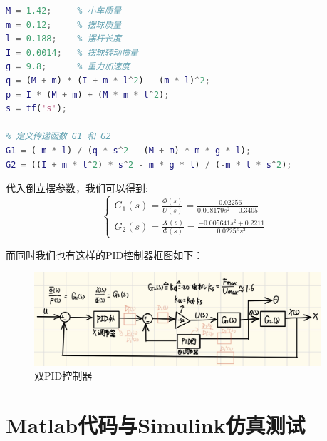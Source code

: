 \documentclass{article}
\begin{document}
\begin{lstlisting}[language=matlab,numbers=none]
% 定义系统参数
M = 1.42;     % 小车质量
m = 0.12;     % 摆球质量
l = 0.188;    % 摆杆长度
I = 0.0014;   % 摆球转动惯量
g = 9.8;      % 重力加速度
q = (M + m) * (I + m * l^2) - (m * l)^2;
p = I * (M + m) + (M * m * l^2);
s = tf('s');

% 定义传递函数 G1 和 G2
G1 = (-m * l) / (q * s^2 - (M + m) * m * g * l);
G2 = ((I + m * l^2) * s^2 - m * g * l) / (-m * l * s^2);

\end{lstlisting}

代入倒立摆参数，我们可以得到:
\[
\left\{
\begin{matrix}
    G_1(s)=\frac{\Phi(s)}{U(s)}=\frac{-0.02256}{0.008179 s^2 - 0.3405}\\
    G_2(s)=\frac{X(s)}{\Phi(s)}=\frac{-0.005641 s^2 + 0.2211}{0.02256 s^2}
\end{matrix}
\right.
\]

而同时我们也有这样的PID控制器框图如下：
\begin{figure}[htbp]
    \centering
    \includegraphics[width=0.95\textwidth]{./imgs/PID_OPTi.png}
    \caption{双PID控制器}
\end{figure}
\section*{Matlab代码与Simulink仿真测试}
\end{document}
